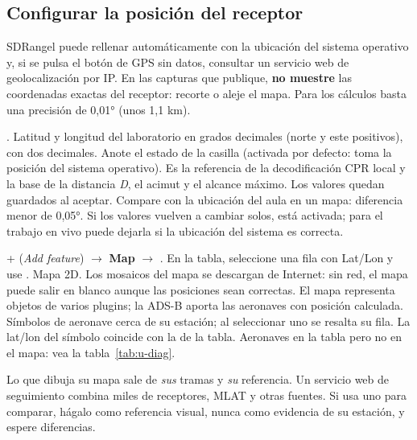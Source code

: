 \subsection{Configurar la posición del receptor}

\begin{alerta}
SDRangel puede rellenar  automáticamente con la ubicación del sistema operativo y, si se pulsa el botón de GPS sin datos, consultar un servicio web de geolocalización por IP. En las capturas que publique, \textbf{no muestre} las coordenadas exactas del receptor: recorte o aleje el mapa. Para los cálculos basta una precisión de 0,01° (unos 1,1 km).
\end{alerta}

{.}
{Latitud y longitud del laboratorio en grados decimales (norte y este positivos), con dos decimales. Anote el estado de la casilla  (activada por defecto: toma la posición del sistema operativo).}
{Es la referencia de la decodificación CPR local y la base de la distancia \emph{D}, el acimut y el alcance máximo.}
{Los valores quedan guardados al aceptar.}
{Compare con la ubicación del aula en un mapa: diferencia menor de 0,05°.}
{Si los valores vuelven a cambiar solos,  está activada; para el trabajo en vivo puede dejarla si la ubicación del sistema es correcta.}

{+ (\emph{Add feature}) $\rightarrow$ \textbf{Map} $\rightarrow$ . En la tabla, seleccione una fila con Lat/Lon y use .}
{Mapa 2D. Los mosaicos del mapa se descargan de Internet: sin red, el mapa puede salir en blanco aunque las posiciones sean correctas.}
{El mapa representa objetos de varios plugins; la ADS-B aporta las aeronaves con posición calculada.}
{Símbolos de aeronave cerca de su estación; al seleccionar uno se resalta su fila.}
{La lat/lon del símbolo coincide con la de la tabla.}
{Aeronaves en la tabla pero no en el mapa: vea la tabla~\ref{tab:u-diag}.}

\begin{importante}
Lo que dibuja su mapa sale de \emph{sus} tramas y \emph{su} referencia. Un servicio web de seguimiento combina miles de receptores, MLAT y otras fuentes. Si usa uno para comparar, hágalo como referencia visual, nunca como evidencia de su estación, y espere diferencias.
\end{importante}

